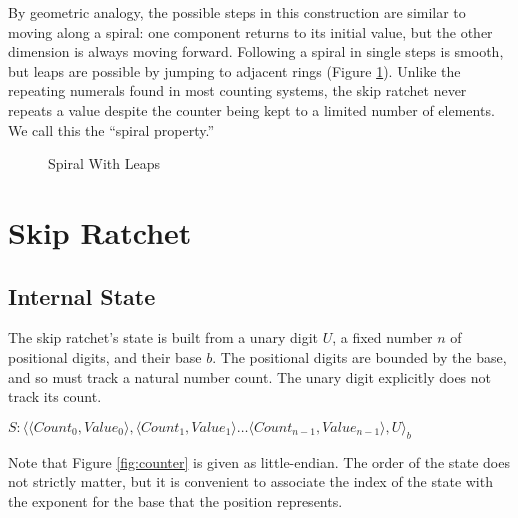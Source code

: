 \documentclass[twocolumn]{article}
\begin{document}
	By geometric analogy, the possible steps in this construction are similar to moving along a spiral: one component returns to its initial value, but the other dimension is always moving forward. Following a spiral in single steps is smooth, but leaps are possible by jumping to adjacent rings (Figure \ref{fig:spiral-metaphor}). Unlike the repeating numerals found in most counting systems, the skip ratchet never repeats a value despite the counter being kept to a limited number of elements. We call this the ``spiral property.''
	
	\begin{figure}[h]
		\centering
		
		
		\caption{Spiral With Leaps}
		\label{fig:spiral-metaphor}
	\end{figure}
	
	\section{Skip Ratchet}
	
	\subsection{Internal State}
	
	The skip ratchet's state is built from a unary digit $U$, a fixed number $n$ of positional digits, and their base $b$. The positional digits are bounded by the base, and so must track a natural number count. The unary digit explicitly does not track its count.
	
	\begin{figure*}[h]
		\centering
		
		$S : \langle \langle Count_{0}, Value_{0} \rangle, \langle Count_{1}, Value_{1} \rangle \ldots \langle Count_{n-1}, Value_{n-1} \rangle, U\rangle_{b}$
		
		\caption{Skip Ratchet Counter State}
		\label{fig:counter}
	\end{figure*}

	Note that Figure \ref{fig:counter} is given as little-endian. The order of the state does not strictly matter, but it is convenient to associate the index of the state with the exponent for the base that the position represents.
	
\end{document}
